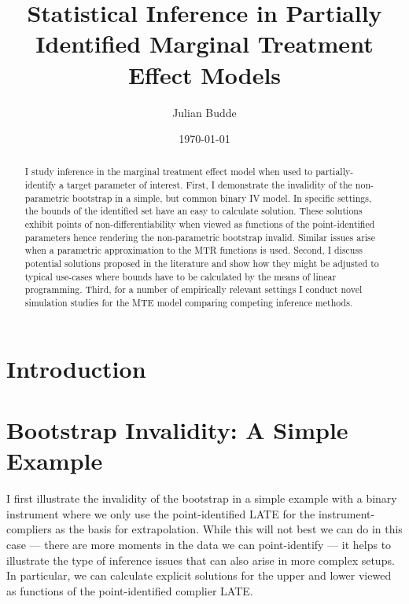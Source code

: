 \documentclass[12pt,a4paper,english]{article} %
\title{Statistical Inference in Partially Identified Marginal Treatment Effect Models}
\author{Julian Budde}
\date{\today}
\numberwithin{equation}{section}
\numberwithin{figure}{section}
\numberwithin{table}{section}
\begin{document}
\maketitle

\begin{abstract}
	I study inference in the marginal treatment effect model when used to partially-identify a target parameter of interest.
	First, I demonstrate the invalidity of the non-parametric bootstrap in a simple, but common binary IV model.
	In specific settings, the bounds of the identified set have an easy to calculate solution.
	These solutions exhibit points of non-differentiability when viewed as functions of the point-identified parameters hence rendering the non-parametric bootstrap invalid.
	Similar issues arise when a parametric approximation to the MTR functions is used.
  Second, I discuss potential solutions proposed in the literature and show how they might be adjusted to typical use-cases where bounds have to be calculated by the means of linear programming.
	Third, for a number of empirically relevant settings I conduct novel simulation studies for the MTE model comparing competing inference methods.
\end{abstract}

\clearpage
\newpage

\tableofcontents

\clearpage
\newpage

\listoftables

\clearpage
\newpage

\listoffigures

\clearpage
\newpage

\section{Introduction}

\section{Bootstrap Invalidity: A Simple Example}
I first illustrate the invalidity of the bootstrap in a simple example with a binary instrument where we only use the point-identified LATE for the instrument-compliers as the basis for extrapolation.
While this will not best we can do in this case --- there are more moments in the data we can point-identify --- it helps to illustrate the type of inference issues that can also arise in more complex setups.
In particular, we can calculate explicit solutions for the upper and lower viewed as functions of the point-identified complier LATE.\@
\end{document}
